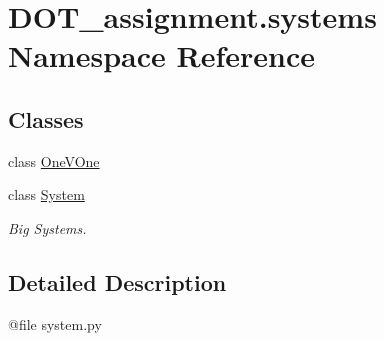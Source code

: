\hypertarget{namespace_d_o_t__assignment_1_1systems}{}\section{D\+O\+T\+\_\+assignment.\+systems Namespace Reference}
\label{namespace_d_o_t__assignment_1_1systems}
\subsection*{Classes}
\begin{DoxyCompactItemize}
\item 
class \mbox{\hyperlink{class_d_o_t__assignment_1_1systems_1_1_one_v_one}{One\+V\+One}}
\item 
class \mbox{\hyperlink{class_d_o_t__assignment_1_1systems_1_1_system}{System}}
\begin{DoxyCompactList}\small\item\em Big Systems. \end{DoxyCompactList}\end{DoxyCompactItemize}


\subsection{Detailed Description}
\begin{DoxyVerb}@file system.py
\end{DoxyVerb}
 